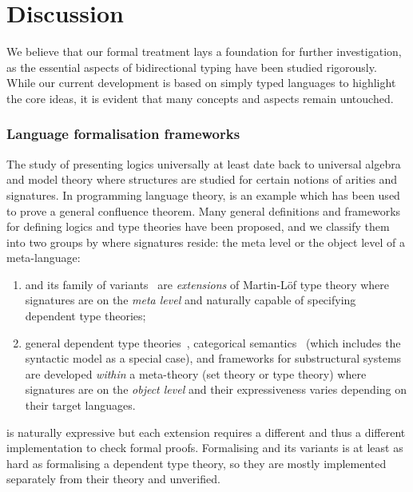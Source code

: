 
\section{Discussion} \label{sec:future}
We believe that our formal treatment lays a foundation for further investigation, as the essential aspects of bidirectional typing have been studied rigorously. 
While our current development is based on simply typed languages to highlight the core ideas, it is evident that many concepts and aspects remain untouched.
\subsubsection{Language formalisation frameworks}

The study of presenting logics universally at least date back to universal algebra and model theory where structures are studied for certain notions of arities and signatures.
In programming language theory,  is an example which has been used to prove a general confluence theorem.
Many general definitions and frameworks for defining logics and type theories have been proposed, and we classify them into two groups by where signatures reside: the meta level or the object level of a meta-language:
\begin{enumerate}
  \item {} and its family of variants~\cite{Harper2007,Assaf2016,Felicissimo2023} are \emph{extensions} of Martin-L\"of type theory where signatures are on the \emph{meta level} and naturally capable of specifying dependent type theories;
\item general dependent type theories~\cite{Bauer2020,Haselwarter2021,Bauer2022a,Uemura2021}, categorical semantics~\cite{Fiore1999,Tanaka2006,Tanaka2006a,Fiore2010,Hamana2011,Fiore2013,Arkor2020,Fiore2022} (which includes the syntactic model as a special case), and frameworks for substructural systems~\cite{Tanaka2006,Tanaka2006a,Wood2022} are developed \emph{within} a meta-theory (set theory or type theory) where signatures are on the \emph{object level} and their expressiveness varies depending on their target languages.
\end{enumerate}

\LF is naturally expressive but each extension requires a different \LF and thus a different implementation to check formal \LF proofs.
Formalising \LF and its variants is at least as hard as formalising a dependent type theory, so they are mostly implemented separately from their theory and unverified.

